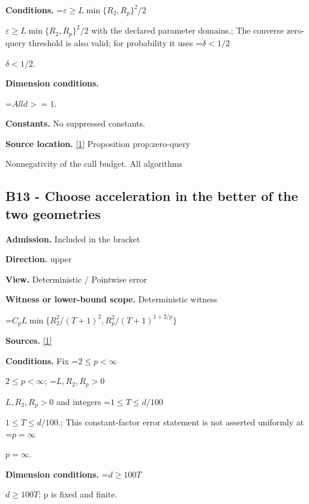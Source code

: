 \documentclass[10pt,a4paper]{article}
\newcommand{\AtlasMath}[1]{\par\begingroup\centering\setbox0=\hbox{$\displaystyle #1$}\ifdim\wd0>1.4\linewidth\typeout{ATLAS WIDE FORMULA: \the\wd0}\fi\ifdim\wd0>\linewidth\resizebox{\linewidth}{!}{\box0}\else\box0\fi\par\endgroup}
\newcommand{\AtlasInlineMath}[1]{\begingroup\setbox0=\hbox{$#1$}\ifdim\wd0>.4\linewidth\endgroup\AtlasMath{#1}\else\endgroup$#1$\fi}
\begin{document}
\textbf{Conditions.} \AtlasInlineMath{\varepsilon\ge L\min\{R_2,R_p\}^2/2} with the declared parameter domains.; The converse zero-query threshold is also valid; for probability it uses \AtlasInlineMath{\delta<1/2}.



\textbf{Dimension conditions.}



\AtlasMath{All d>=1.}


\textbf{Constants.} No suppressed constants.



\textbf{Source location.} \href{https://github.com/WU-Wendao/Colombo/blob/main/colombo_sensorium/Complexity_altas/data/sources/colombo/U02/manuscript.pdf}{[1]} Proposition prop:zero-query



Nonnegativity of the call budget. All algorithms



\subsection{B13 - Choose acceleration in the better of the two geometries}


\textbf{Admission.} Included in the bracket



\textbf{Direction.} upper



\textbf{View.} Deterministic / Pointwise error



\textbf{Witness or lower-bound scope.} Deterministic witness



\AtlasMath{C_pL\min\{R_2^2/(T+1)^2,R_p^2/(T+1)^{1+2/p}\}}


\textbf{Sources.} \href{https://github.com/WU-Wendao/Colombo/blob/main/colombo_sensorium/Complexity_altas/data/sources/colombo/U02/manuscript.pdf}{[1]}



\textbf{Conditions.} Fix \AtlasInlineMath{2\le p<\infty}; \AtlasInlineMath{L,R_2,R_p>0} and integers \AtlasInlineMath{1\le T\le d/100}.; This constant-factor error statement is not asserted uniformly at \AtlasInlineMath{p=\infty}.



\textbf{Dimension conditions.} \AtlasInlineMath{d\ge100T}; p is fixed and finite.
\end{document}
